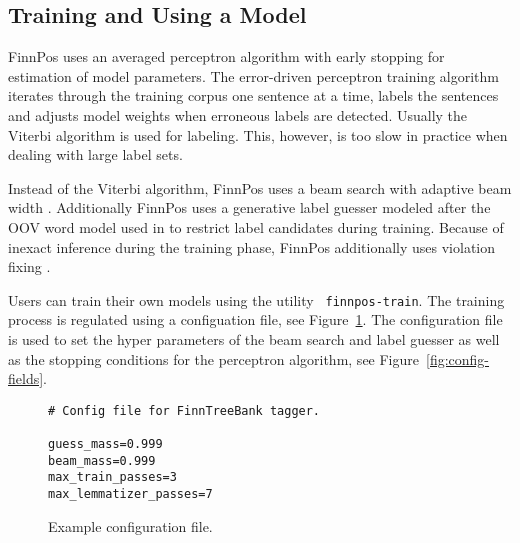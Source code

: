\documentclass{llncs}
\begin{document}
\subsection{Training and Using a Model}

FinnPos uses an averaged perceptron algorithm with early stopping for
estimation of model parameters. The error-driven perceptron training
algorithm iterates through the training corpus one sentence at a time,
labels the sentences and adjusts model weights when erroneous labels
are detected. Usually the Viterbi algorithm \cite{collins/2002} is
used for labeling. This, however, is too slow in practice when dealing
with large label sets.

Instead of the Viterbi algorithm, FinnPos uses a beam search with
adaptive beam width \cite{pal/2006}. Additionally FinnPos uses a generative
label guesser modeled after the OOV word model used in
\cite{brants/2000} to restrict label candidates during
training. Because of inexact inference during the training phase,
FinnPos additionally uses violation fixing \cite{huang/2012}.

Users can train their own models using the utility {\tt
  finnpos-train}. The training process is regulated using a
configuation file, see Figure~\ref{fig:config-file}. The
configuration file is used to set the hyper parameters of the beam
search and label guesser as well as the stopping conditions for the
perceptron algorithm, see Figure~\ref{fig:config-fields}.

\begin{figure}
\begin{framed}
\begin{verbatim}
# Config file for FinnTreeBank tagger.

guess_mass=0.999
beam_mass=0.999
max_train_passes=3
max_lemmatizer_passes=7
\end{verbatim}
\end{framed}
\caption{Example configuration file.}\label{fig:config-file}
\end{figure}
\end{document}
